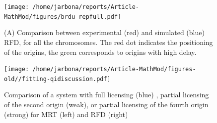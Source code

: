 \documentclass[10pt,a4paper]{revtex4-2}
\begin{document}
\begin{figure}
\texttt{[image: /home/jarbona/reports/Article-MathMod/figures/brdu\_repfull.pdf]}

\caption{(A) Comparison between experimental (red) and simulated (blue) RFD, for all the chromosomes. The red dot indicates the positioning of the origins, the green corresponds to origins with high delay.}\label{fig:fit_rfd_all_brdu}
\end{figure}


\begin{figure}
\texttt{[image: /home/jarbona/reports/Article-MathMod/figures-old//fitting-qidiscussion.pdf]}

\caption{Comparison of a system with full licensing (blue) , partial licensing of the second origin (weak), or partial licensing of the fourth origin (strong) for MRT (left) and RFD (right) }\label{si:qi}
\end{figure}
\end{document}
